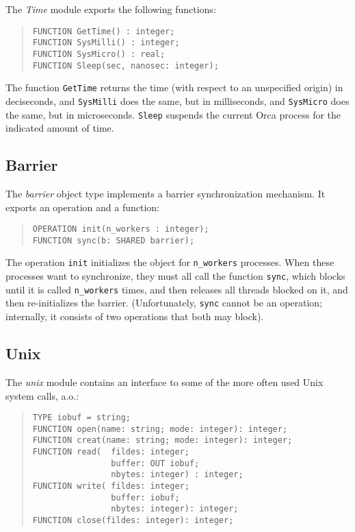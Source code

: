 \documentclass[10pt]{article}
\begin{document}
The {\em Time} module exports the following functions:
\begin{quote}
\begin{verbatim}
FUNCTION GetTime() : integer;
FUNCTION SysMilli() : integer;
FUNCTION SysMicro() : real;
FUNCTION Sleep(sec, nanosec: integer);
\end{verbatim}
\end{quote}
The function \verb+GetTime+ returns the time (with respect to an unspecified
origin) in deciseconds, and \verb+SysMilli+ does the same, but in milliseconds,
and \verb+SysMicro+ does the same, but in microseconds.
\verb+Sleep+ suspends the current Orca process for the indicated amount of
time.


\subsection{Barrier}

The {\em barrier} object type implements a barrier synchronization mechanism.
It exports an operation and a function:
\begin{quote}
\begin{verbatim}
OPERATION init(n_workers : integer);
FUNCTION sync(b: SHARED barrier);
\end{verbatim}
\end{quote}
The operation \verb+init+ initializes the object for \verb+n_workers+
processes. 
When these processes want to synchronize, they must all call the
function \verb+sync+, which blocks until it is called \verb+n_workers+
times, and then releases all threads blocked on it, and then re-initializes
the barrier.
(Unfortunately, \verb+sync+ cannot be an operation; internally, it consists
of two operations that both may block).

\subsection{Unix}

The {\em unix} module contains an interface to some of the more often used
Unix
system calls, a.o.:
\begin{quote}
\begin{verbatim}
TYPE iobuf = string;
FUNCTION open(name: string; mode: integer): integer;
FUNCTION creat(name: string; mode: integer): integer;
FUNCTION read(  fildes: integer;
                buffer: OUT iobuf;
                nbytes: integer) : integer;
FUNCTION write( fildes: integer;
                buffer: iobuf;
                nbytes: integer): integer;
FUNCTION close(fildes: integer): integer;
\end{verbatim}
\end{quote}
\end{document}
